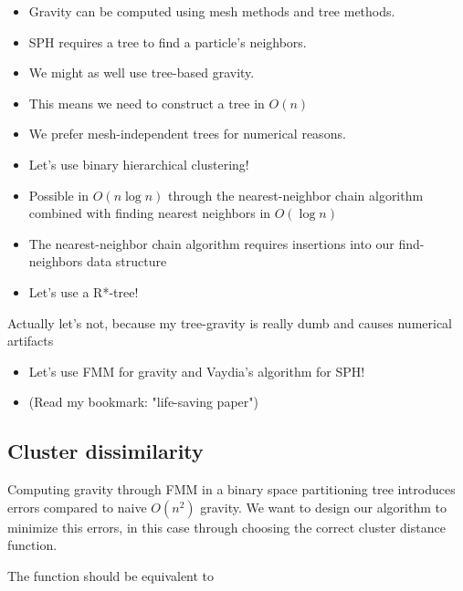 \documentclass[../main.tex]{subfiles}
\begin{document}
\begin{itemize}
    \item Gravity can be computed using mesh methods and tree methods.
    \item SPH requires a tree to find a particle's neighbors.
    \item We might as well use tree-based gravity.
    \item This means we need to construct a tree in $O(n)$
    \item We prefer mesh-independent trees for numerical reasons.
    \item Let's use binary hierarchical clustering!
    \item Possible in $O(n\log n)$ through the nearest-neighbor chain algorithm combined with finding nearest neighbors in $O(\log n)$
    \item The nearest-neighbor chain algorithm requires insertions into our find-neighbors data structure
    \item Let's use a R*-tree!
\end{itemize}
Actually let's not, because my tree-gravity is really dumb and causes numerical artifacts
\begin{itemize}
    \item Let's use FMM for gravity and Vaydia's algorithm for SPH!
    \item (Read my bookmark: "life-saving paper")
\end{itemize}

\subsection{Cluster dissimilarity}
Computing gravity through FMM in a binary space partitioning tree introduces errors compared to naive $O(n^2)$ gravity. We want to design our algorithm to minimize this errors, in this case through choosing the correct cluster distance function.

The function should be equivalent to
\end{document}
